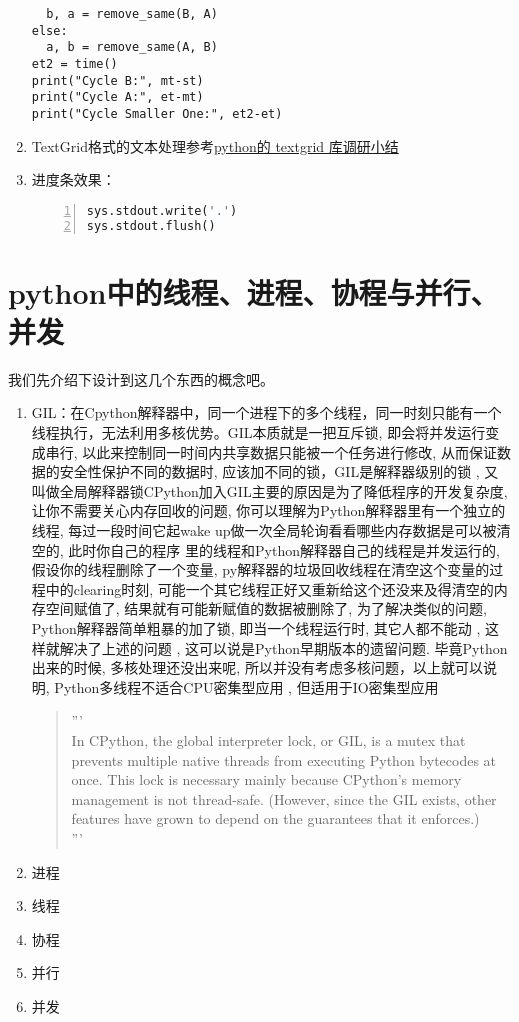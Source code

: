 \begin{enumerate}
\begin{lstlisting}
  b, a = remove_same(B, A)
else:
  a, b = remove_same(A, B)
et2 = time()
print("Cycle B:", mt-st)
print("Cycle A:", et-mt)
print("Cycle Smaller One:", et2-et)
    \end{lstlisting}
  \item TextGrid格式的文本处理参考\href{https://blog.csdn.net/duxin_csdn/article/details/88966295}{python的 textgrid 库调研小结}
  \item 进度条效果：
    \begin{lstlisting}[language = python, numbers=left, 
             numberstyle=\tiny,keywordstyle=\color{blue!70},
             commentstyle=\color{red!50!green!50!blue!50},frame=shadowbox,
             rulesepcolor=\color{red!20!green!20!blue!20},basicstyle=\ttfamily]
sys.stdout.write('.')
sys.stdout.flush()
    \end{lstlisting}  
\end{enumerate}


\section{python中的线程、进程、协程与并行、并发}
我们先介绍下设计到这几个东西的概念吧。
\begin{enumerate}
    \item GIL：在Cpython解释器中，同一个进程下的多个线程，同一时刻只能有一个线程执行，无法利用多核优势。GIL本质就是一把互斥锁, 即会将并发运行变成串行, 以此来控制同一时间内共享数据只能被一个任务进行修改, 从而保证数据的安全性保护不同的数据时, 应该加不同的锁，GIL是解释器级别的锁 , 又叫做全局解释器锁CPython加入GIL主要的原因是为了降低程序的开发复杂度, 让你不需要关心内存回收的问题, 你可以理解为Python解释器里有一个独立的线程, 每过一段时间它起wake up做一次全局轮询看看哪些内存数据是可以被清空的, 此时你自己的程序 里的线程和Python解释器自己的线程是并发运行的, 假设你的线程删除了一个变量, py解释器的垃圾回收线程在清空这个变量的过程中的clearing时刻, 可能一个其它线程正好又重新给这个还没来及得清空的内存空间赋值了, 结果就有可能新赋值的数据被删除了, 为了解决类似的问题, Python解释器简单粗暴的加了锁, 即当一个线程运行时, 其它人都不能动 , 这样就解决了上述的问题 , 这可以说是Python早期版本的遗留问题. 毕竟Python出来的时候, 多核处理还没出来呢, 所以并没有考虑多核问题，以上就可以说明, Python多线程不适合CPU密集型应用 , 但适用于IO密集型应用
      \begin{quotation}
      '''\\
      In CPython, the global interpreter lock, or GIL, is a mutex that prevents multiple 
      native threads from executing Python bytecodes at once. This lock is necessary mainly 
      because CPython’s memory management is not thread-safe. (However, since the GIL 
      exists, other features have grown to depend on the guarantees that it enforces.)\\
      '''
      \end{quotation}
    \item 进程
    \item 线程
    \item 协程
    \item 并行
    \item 并发
\end{enumerate}

